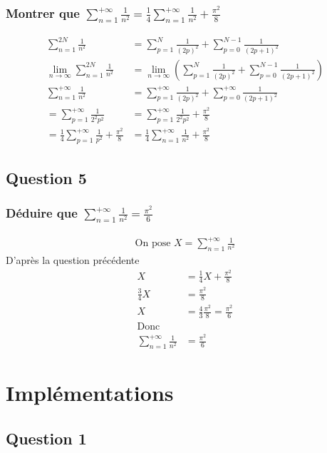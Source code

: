 \documentclass[a4paper,10pt]{report}
\begin{document}
\subsubsection{Montrer que $\sum_{n=1}^{+\infty}\frac{1}{n^2} = \frac{1}{4}\sum_{n=1}^{+\infty}\frac{1}{n^2} + \frac{\pi^2}{8}$}
\begin{align*}
\sum_{n=1}^{2N}\frac{1}{n^2} &= \sum_{p=1}^{N}\frac{1}{(2p)^2} + \sum_{p=0}^{N-1}\frac{1}{(2p+1)^2}\\
\lim_{n\to\infty} \sum_{n=1}^{2N}\frac{1}{n^2} &= \lim_{n\to\infty}(\sum_{p=1}^{N}\frac{1}{(2p)^2} + \sum_{p=0}^{N-1}\frac{1}{(2p+1)^2})\\
\sum_{n=1}^{+\infty}\frac{1}{n^2} &= \sum_{p=1}^{+\infty}\frac{1}{(2p)^2} + \sum_{p=0}^{+\infty}\frac{1}{(2p+1)^2}\\
=\sum_{p=1}^{+\infty}\frac{1}{2^2 p^2} &= \sum_{p=1}^{+\infty}\frac{1}{2^2 p^2} + \frac{\pi^2}{8}\\
=\frac{1}{4}\sum_{p=1}^{+\infty}\frac{1}{p^2} + \frac{\pi^2}{8} &= \frac{1}{4}\sum_{n=1}^{+\infty}\frac{1}{n^2} + \frac{\pi^2}{8}
\end{align*}

\subsection{Question 5}
\subsubsection{Déduire que $\sum_{n=1}^{+\infty} \frac{1}{n^2} = \frac{\pi^2}{6}$}
\begin{align*}
\text{On pose } X = \sum_{n=1}^{+\infty} \frac{1}{n^2}
\end{align*}
D'après la question précédente
\begin{align*}
X &= \frac{1}{4}X + \frac{\pi^2}{8}\\
\frac{3}{4}X &= \frac{\pi^2}{8}\\
X &= \frac{4}{3} \frac{\pi^2}{8} = \frac{\pi^2}{6}\\
\text{Donc}\\
\sum_{n=1}^{+\infty} \frac{1}{n^2} &= \frac{\pi^2}{6}
\end{align*}

\clearpage
\section{Implémentations}
\subsection{Question 1}
\end{document}
